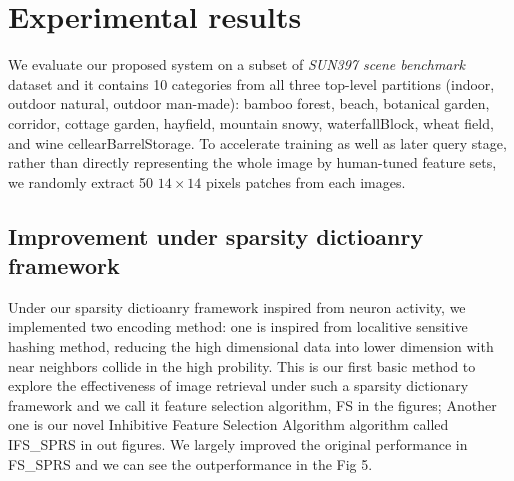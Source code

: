 \documentclass[letterpaper]{article}
\begin{document}
\section{Experimental results}
We evaluate our proposed system on a subset of \emph{SUN397 scene benchmark} dataset and it contains 10 categories from all three top-level partitions (indoor, outdoor natural, outdoor man-made): bamboo forest, beach, botanical garden, corridor, cottage garden, hayfield, mountain snowy, waterfallBlock, wheat field, and wine cellearBarrelStorage.  To accelerate training as well as later query stage, rather than directly representing the whole image by human-tuned feature sets, we randomly extract 50 $14\times14$ pixels patches from each images.


\subsection{Improvement under sparsity dictioanry framework}
Under our sparsity dictioanry framework inspired from neuron activity, we implemented two encoding method: one is inspired from localitive sensitive hashing method, reducing the high dimensional data into lower dimension with near neighbors collide in the high probility. This is our first basic method to explore the effectiveness of image retrieval under such a sparsity dictionary framework and we call it feature selection algorithm, FS in the figures; Another one is our novel Inhibitive Feature Selection Algorithm algorithm called IFS\_SPRS in out figures. We largely improved the original performance in FS\_SPRS and we can see the outperformance in the Fig 5.
\end{document}

